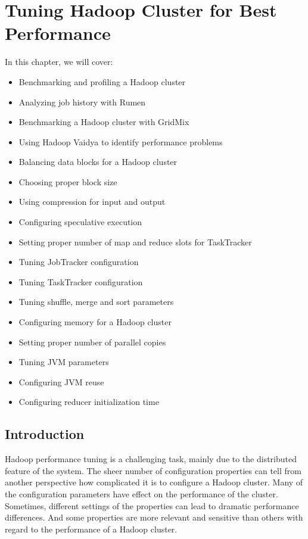 \chapter{Tuning Hadoop Cluster for Best Performance}\label{chap:7}
In this chapter, we will cover:
\begin{itemize}
  \item Benchmarking and profiling a Hadoop cluster
  \item Analyzing job history with Rumen
  \item Benchmarking a Hadoop cluster with GridMix
  \item Using Hadoop Vaidya to identify performance problems
  \item Balancing data blocks for a Hadoop cluster
  \item Choosing proper block size
  \item Using compression for input and output
  \item Configuring speculative execution
  \item Setting proper number of map and reduce slots for TaskTracker
  \item Tuning JobTracker configuration
  \item Tuning TaskTracker configuration
  \item Tuning shuffle, merge and sort parameters
  \item Configuring memory for a Hadoop cluster
  \item Setting proper number of parallel copies
  \item Tuning JVM parameters
  \item Configuring JVM reuse
  \item Configuring reducer initialization time
\end{itemize}

\section{Introduction}
Hadoop performance tuning is a challenging task, mainly due to the distributed feature of the system. The sheer number of configuration properties can tell from another perspective how complicated it is to configure a Hadoop cluster. Many of the configuration parameters have effect on the performance of the cluster. Sometimes, different settings of the properties can lead to dramatic performance differences. And some properties are more relevant and sensitive than others with regard to the performance of a Hadoop cluster.

